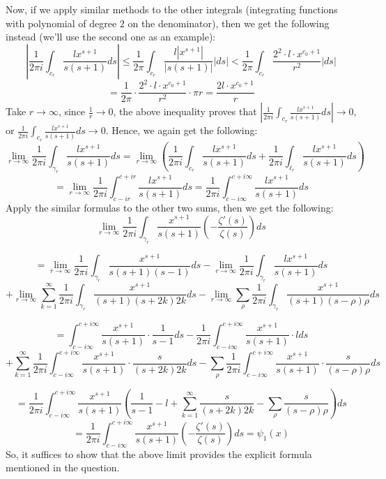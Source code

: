 \documentclass{article}
\begin{document}
Now, if we apply similar methods to the other integrals (integrating functions with polynomial of degree $2$ on the denominator), then we get the following instead (we'll use the second one as an example):
$$\left|\frac{1}{2\pi i}\int_{c_{r}}\frac{lx^{s+1}}{s(s+1)}ds\right|\leq \frac{1}{2\pi}\int_{c_r}\frac{l|x^{s+1}|}{|s(s+1)|}|ds| < \frac{1}{2\pi}\int_{c_r}\frac{2^2\cdot l\cdot x^{c_0+1}}{r^2}|ds|$$
$$ = \frac{1}{2\pi}\cdot \frac{2^2\cdot l\cdot x^{c_0+1}}{r^2}\cdot \pi r = \frac{2l\cdot x^{c_0+1}}{r}$$
Take $r\rightarrow\infty$, since $\frac{1}{r}\rightarrow 0$, the above inequality proves that $\left|\frac{1}{2\pi i}\int_{c_{r}}\frac{lx^{s+1}}{s(s+1)}ds\right|\rightarrow 0$, or $\frac{1}{2\pi i}\int_{c_{r}}\frac{lx^{s+1}}{s(s+1)}ds\rightarrow 0$. Hence, we again get the following:
$$\lim_{r\rightarrow\infty}\frac{1}{2\pi i}\int_{\gamma_{r}}\frac{lx^{s+1}}{s(s+1)}ds = \lim_{r\rightarrow\infty}\left(\frac{1}{2\pi i}\int_{c_{r}}\frac{lx^{s+1}}{s(s+1)}ds+\frac{1}{2\pi i}\int_{\ell_{r}}\frac{lx^{s+1}}{s(s+1)}ds\right)$$
$$ = \lim_{r\rightarrow\infty}\frac{1}{2\pi i}\int_{c-ir}^{c+ir}\frac{lx^{s+1}}{s(s+1)}ds = \frac{1}{2\pi i}\int_{c-i\infty}^{c+i\infty}\frac{lx^{s+1}}{s(s+1)}ds$$
Apply the similar formulas to the other two sums, then we get the following:
$$\lim_{r\rightarrow\infty}\frac{1}{2\pi i}\int_{\gamma_{r}}\frac{x^{s+1}}{s(s+1)}\left(-\frac{\zeta'(s)}{\zeta(s)}\right)ds$$

\hfil

$$ = \lim_{r\rightarrow\infty}\frac{1}{2\pi i}\int_{\gamma_{r}}\frac{x^{s+1}}{s(s+1)(s-1)}ds-\lim_{r\rightarrow\infty}\frac{1}{2\pi i}\int_{\gamma_{r}}\frac{lx^{s+1}}{s(s+1)}ds$$
$$+ \lim_{r\rightarrow\infty}\sum_{k=1}^{\infty}\frac{1}{2\pi i}\int_{\gamma_{r}}\frac{x^{s+1}}{(s+1)(s+2k)2k}ds - \lim_{r\rightarrow\infty}\sum_{\rho}\frac{1}{2\pi i}\int_{\gamma_{r}}\frac{x^{s+1}}{(s+1)(s-\rho)\rho}ds$$

\hfil

$$ = \int_{c-i\infty}^{c+i\infty}\frac{x^{s+1}}{s(s+1)}\cdot \frac{1}{s-1}ds-\frac{1}{2\pi i}\int_{c-i\infty}^{c+i\infty}\frac{x^{s+1}}{s(s+1)}\cdot l ds$$
$$+\sum_{k=1}^{\infty}\frac{1}{2\pi i}\int_{c-i\infty}^{c+i\infty}\frac{x^{s+1}}{s(s+1)}\cdot \frac{s}{(s+2k)2k}ds -\sum_{\rho}\frac{1}{2\pi i}\int_{c-i\infty}^{c+i\infty}\frac{x^{s+1}}{s(s+1)}\cdot \frac{s}{(s-\rho)\rho}ds$$

\hfil

$$ = \frac{1}{2\pi i}\int_{c-i\infty}^{c+i\infty}\frac{x^{s+1}}{s(s+1)}\left(\frac{1}{s-1}-l+\sum_{k=1}^{\infty}\frac{s}{(s+2k)2k}-\sum_{\rho}\frac{s}{(s-\rho)\rho}\right)ds$$
$$ = \frac{1}{2\pi i}\int_{c-i\infty}^{c+i\infty}\frac{x^{s+1}}{s(s+1)}\left(-\frac{\zeta'(s)}{\zeta(s)}\right)ds = \psi_1(x)$$
So, it suffices to show that the above limit provides the explicit formula mentioned in the question.
\end{document}
